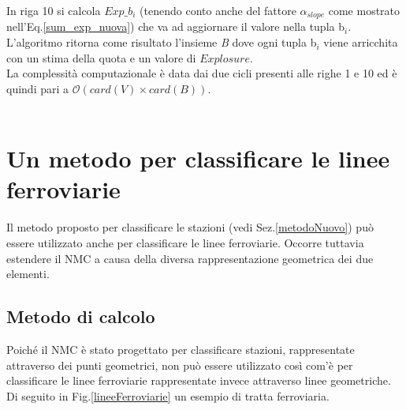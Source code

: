 In riga 10 si calcola $Exp\_b_i$ (tenendo conto anche del fattore $\alpha_{slope}$ come mostrato nell'Eq.\ref{sum_exp_nuova}) che va ad aggiornare il valore nella tupla b$_i$.\\
L'algoritmo ritorna come risultato l'insieme \textit{B} dove ogni tupla b$_i$ viene arricchita con un stima della quota e un valore di $Explosure$. 
\mbox{}\\
La complessità computazionale è data dai due cicli presenti alle righe 1 e 10 ed è quindi pari a $\mathcal{O}(card(\textit{V}) \times card(\textit{B}))$. \\
\mbox{}\\





\section{Un metodo per classificare le linee ferroviarie}
Il metodo proposto per classificare le stazioni (vedi Sez.\ref{metodoNuovo}) può essere utilizzato anche per classificare le linee ferroviarie. Occorre tuttavia estendere il NMC a causa della diversa rappresentazione geometrica dei due elementi.


\subsection{Metodo di calcolo}
\label{metodoLinee}
Poiché il NMC è stato progettato per classificare stazioni,  rappresentate attraverso dei punti geometrici, non può essere utilizzato così com'è per classificare le linee ferroviarie rappresentate invece attraverso linee geometriche. Di seguito in Fig.\ref{lineeFerroviarie} un esempio di tratta ferroviaria.

